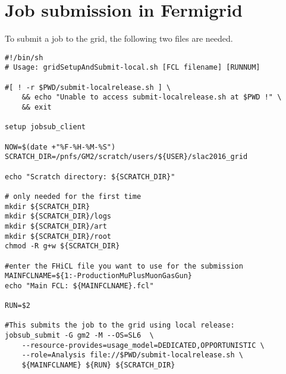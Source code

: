 \chapter{Job submission in Fermigrid}
\label{app:grid}

To submit a job to the grid, the following two files are needed.

\begin{Verbatim}
#!/bin/sh
# Usage: gridSetupAndSubmit-local.sh [FCL filename] [RUNNUM]

#[ ! -r $PWD/submit-localrelease.sh ] \
	&& echo "Unable to access submit-localrelease.sh at $PWD !" \
	&& exit

setup jobsub_client

NOW=$(date +"%F-%H-%M-%S")
SCRATCH_DIR=/pnfs/GM2/scratch/users/${USER}/slac2016_grid

echo "Scratch directory: ${SCRATCH_DIR}"

# only needed for the first time
mkdir ${SCRATCH_DIR}
mkdir ${SCRATCH_DIR}/logs
mkdir ${SCRATCH_DIR}/art
mkdir ${SCRATCH_DIR}/root
chmod -R g+w ${SCRATCH_DIR}

#enter the FHiCL file you want to use for the submission
MAINFCLNAME=${1:-ProductionMuPlusMuonGasGun}
echo "Main FCL: ${MAINFCLNAME}.fcl"

RUN=$2

#This submits the job to the grid using local release:
jobsub_submit -G gm2 -M --OS=SL6  \
	--resource-provides=usage_model=DEDICATED,OPPORTUNISTIC \
	--role=Analysis file://$PWD/submit-localrelease.sh \
	${MAINFCLNAME} ${RUN} ${SCRATCH_DIR}
\end{Verbatim}

